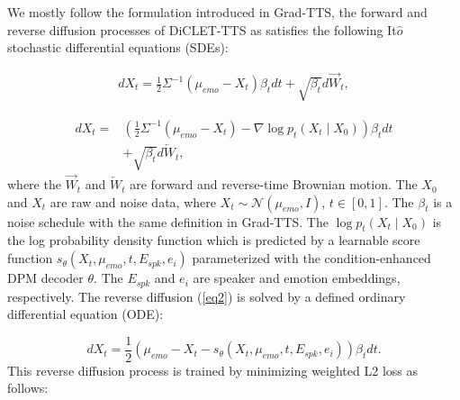\documentclass[journal,comsoc]{IEEEtran}
\begin{document}
We mostly follow the formulation introduced in Grad-TTS, the forward and reverse diffusion processes of DiCLET-TTS as satisfies the following It$\widehat{o}$ stochastic differential equations (SDEs):

\begin{equation}
\begin{aligned}
d X_t=\frac{1}{2} \Sigma^{-1}\left(\mu_{emo}-X_t\right) \beta_t d t+\sqrt{\beta_t} d \overrightarrow{W}_t,
\end{aligned}
\end{equation}

\begin{equation}
\begin{aligned}
\label{eq2}
d X_t=&\left(\frac{1}{2}\Sigma^{-1}\left(\mu_{emo}-X_t\right)-\nabla \log p_t\left(X_t \mid X_0\right)\right) \beta_t d t
\\&+\sqrt{\beta_t} d \overleftarrow{W}_t,
\end{aligned}
\end{equation}
where the $\overrightarrow{W}_t$ and $\overleftarrow{W}_t$ are forward and reverse-time Brownian motion. The $X_{0}$ and $X_{t}$ are raw and noise data, where $X_{t}\sim\mathcal{N}(\mu_{emo}, I)$, $t \in[0,1]$.
The $\beta_{t}$ is a noise schedule with the same definition in Grad-TTS. 
The $\log p_{t}\left(X_{t} \mid X_{0}\right)$ is the log probability density function which is predicted by a learnable score function $s_{\theta}\left(X_{t}, \mu_{emo}, t, E_{spk}, e_{i}\right)$ parameterized with the condition-enhanced DPM decoder $\theta$.
The $E_{spk}$ and $e_{i}$ are speaker and emotion embeddings, respectively.
The reverse diffusion (\ref{eq2}) is solved by a defined ordinary differential equation (ODE):

\begin{equation}
d X_{t}=\frac{1}{2}\left(\mu_{emo}-X_{t}-s_{\theta}\left(X_{t}, \mu_{emo}, t, E_{spk}, e_{i}\right)\right) \beta_{t} d t.
\end{equation}
This reverse diffusion process is trained by minimizing weighted L2 loss as follows:
\end{document}
